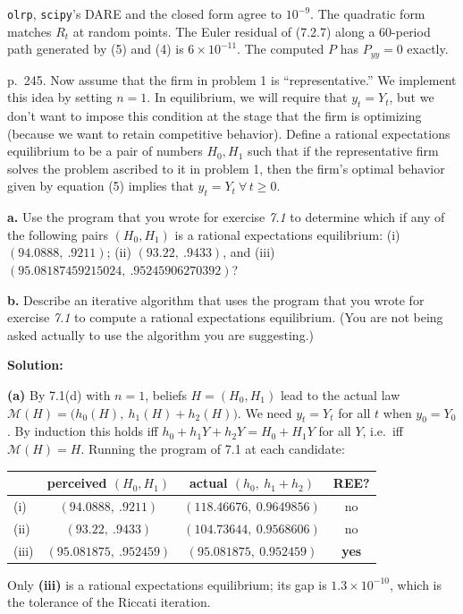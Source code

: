\documentclass[12pt, letterpaper]{article}
\begin{document}
\begin{tcolorbox}[oddbox,title={Exercise 7.1 \quad A competitive firm}]
\begin{tcolorbox}[databox]
\texttt{olrp}, \texttt{scipy}'s DARE and the closed form agree to $10^{-9}$. The quadratic form
matches $R_t$ at random points. The Euler residual of (7.2.7) along a 60-period path generated by
(5) and (4) is $6\times10^{-11}$. The computed $P$ has $P_{yy}=0$ exactly.
\end{tcolorbox}
\end{tcolorbox}

\begin{tcolorbox}[evenbox,title={Exercise 7.2 \quad Rational expectations}]
\begin{tcolorbox}[questionbox]
p.~245. Now assume that the firm in problem 1 is ``representative.'' We implement this idea by
setting $n=1$. In equilibrium, we will require that $y_t=Y_t$, but we don't want to impose this
condition at the stage that the firm is optimizing (because we want to retain competitive behavior).
Define a rational expectations equilibrium to be a pair of numbers $H_0,H_1$ such that if the
representative firm solves the problem ascribed to it in problem 1, then the firm's optimal behavior
given by equation (5) implies that $y_t=Y_t\ \forall\,t\ge0$.

\textbf{a.} Use the program that you wrote for exercise \textit{7.1} to determine which if any of the
following pairs $(H_0,H_1)$ is a rational expectations equilibrium: (i) $(94.0888,\ .9211)$;
(ii) $(93.22,\ .9433)$, and (iii) $(95.08187459215024,\ .95245906270392)$?

\textbf{b.} Describe an iterative algorithm that uses the program that you wrote for exercise
\textit{7.1} to compute a rational expectations equilibrium. (You are not being asked actually to use
the algorithm you are suggesting.)
\end{tcolorbox}

\textbf{Solution:}

\textbf{(a)} By 7.1(d) with $n=1$, beliefs $H=(H_0,H_1)$ lead to the actual law
$\mathcal M(H)=\big(h_0(H),\ h_1(H)+h_2(H)\big)$. We need $y_t=Y_t$ for all $t$ when $y_0=Y_0$. By
induction this holds iff $h_0+h_1Y+h_2Y=H_0+H_1Y$ for all $Y$, i.e.\ iff $\mathcal M(H)=H$. Running
the program of 7.1 at each candidate:
\medskip

\begin{center}
\begin{tabular}{@{}lccc@{}}
\toprule
& perceived $(H_0,H_1)$ & actual $(h_0,\ h_1+h_2)$ & REE? \\
\midrule
(i) & $(94.0888,\ .9211)$ & $(118.46676,\ 0.9649856)$ & no \\
(ii) & $(93.22,\ .9433)$ & $(104.73644,\ 0.9568606)$ & no \\
(iii) & $(95.081875,\ .952459)$ & $(95.081875,\ 0.952459)$ & \textbf{yes} \\
\bottomrule
\end{tabular}
\end{center}
Only \textbf{(iii)} is a rational expectations equilibrium; its gap is $1.3\times10^{-10}$, which is
the tolerance of the Riccati iteration.


\end{tcolorbox}
\end{document}
